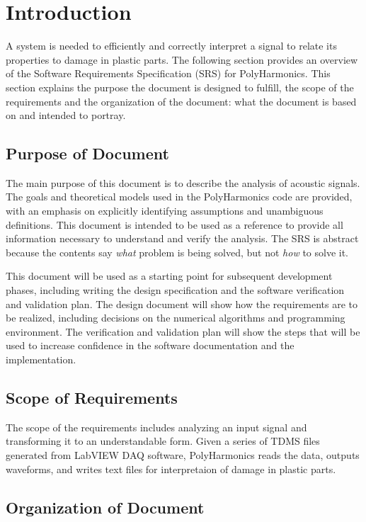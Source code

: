 \documentclass[12pt]{article}
\newcommand{\progname}{PolyHarmonics}
\begin{document}
\section{Introduction}

A system is needed to efficiently and correctly interpret a signal to relate its 
properties to damage in plastic parts.
The following section provides an overview of the Software Requirements
Specification (SRS) for \progname.
This section explains the purpose the document is designed to fulfill, the scope 
of the requirements and the organization of the document: what the document is 
based on and intended to portray.

\subsection{Purpose of Document}

The main purpose of this document is to describe the analysis of acoustic 
signals.
The goals and theoretical models used in the 
\progname{} code are provided, with an emphasis on explicitly identifying 
assumptions and unambiguous definitions.  This document is intended to be used 
as a reference to provide all information necessary to 
understand and verify the analysis.  The SRS is abstract because the contents 
say
\emph{what} problem is being solved, but not \emph{how} to solve it.

This document will be used as a starting point for subsequent development
phases, including writing the design specification and the software verification
and validation plan.  The design document will show how the requirements are to
be realized, including decisions on the numerical algorithms and programming
environment.  The verification and validation plan will show the steps that will
be used to increase confidence in the software documentation and the
implementation.  

\subsection{Scope of Requirements} 

The scope of the requirements includes analyzing an input signal and
transforming it to an understandable form. Given a series of TDMS files generated 
from LabVIEW DAQ software, \progname{} reads the data, outputs waveforms, 
and writes text files for interpretaion of damage in plastic parts.

\subsection{Organization of Document}
\end{document}
